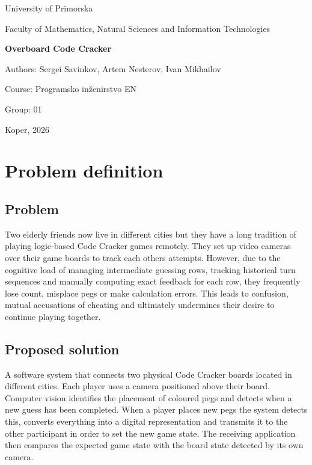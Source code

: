 \documentclass[11pt, a4paper]{article}
\begin{document}
\begin{titlepage}
    \centering
    \vspace*{1cm}
    {\large University of Primorska\par}
    \vspace{0.2cm}
    {\large Faculty of Mathematics, Natural Sciences and Information Technologies\par}

    \vspace{4cm}

    {\Huge \bfseries Overboard Code Cracker\par}

    \vspace{4.5cm}

    \begin{flushright}
        {\large Authors: Sergei Savinkov, Artem Nesterov, Ivan Mikhailov\par
        Course: Programsko inženirstvo EN\par
        Group: 01\par}
    \end{flushright}

    \vfill

    {\large Koper, 2026\par}

\end{titlepage}

\section{Problem definition}
\subsection{Problem}
Two elderly friends now live in different cities but they have a long tradition of playing logic-based Code Cracker games remotely.
They set up video cameras over their game boards to track each others attempts.
However, due to the cognitive load of managing intermediate guessing rows, 
tracking historical turn sequences and manually computing exact feedback for each row, 
they frequently lose count, misplace pegs or make calculation errors.
This leads to confusion, mutual accusations of cheating and ultimately undermines their desire to continue playing together.

\subsection{Proposed solution}
A software system that connects two physical Code Cracker boards located in different cities. Each player uses a camera positioned above their board. 
Computer vision identifies the placement of coloured pegs and detects when a new guess has been completed. 
When a player places new pegs the system detects this, converts everything into a digital representation and transmits it to the other participant in order to set the new game state. 
The receiving application then compares the expected game state with the board state detected by its own camera.
\end{document}
